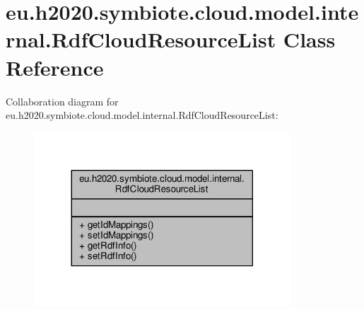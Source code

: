 \hypertarget{classeu_1_1h2020_1_1symbiote_1_1cloud_1_1model_1_1internal_1_1RdfCloudResourceList}{}\section{eu.\+h2020.\+symbiote.\+cloud.\+model.\+internal.\+Rdf\+Cloud\+Resource\+List Class Reference}
\label{classeu_1_1h2020_1_1symbiote_1_1cloud_1_1model_1_1internal_1_1RdfCloudResourceList}


Collaboration diagram for eu.\+h2020.\+symbiote.\+cloud.\+model.\+internal.\+Rdf\+Cloud\+Resource\+List\+:
\nopagebreak
\begin{figure}[H]
\begin{center}
\leavevmode
\includegraphics[width=272pt]{classeu_1_1h2020_1_1symbiote_1_1cloud_1_1model_1_1internal_1_1RdfCloudResourceList__coll__graph}
\end{center}
\end{figure}
